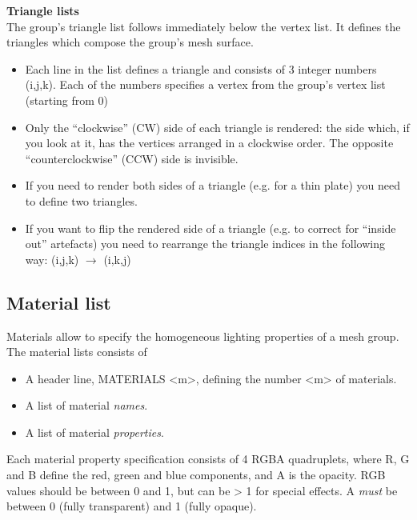 \documentclass[Orbiter Developer Manual.tex]{subfiles}
\begin{document}
\noindent
\textbf{Triangle lists}\\
The group’s triangle list follows immediately below the vertex list. It defines the triangles which compose the group’s mesh surface.

\begin{itemize}
\item Each line in the list defines a triangle and consists of 3 integer numbers (i,j,k). Each of the numbers specifies a vertex from the group’s vertex list (starting from 0)
\item Only the “clockwise” (CW) side of each triangle is rendered: the side which, if you look at it, has the vertices arranged in a clockwise order. The opposite “counterclockwise” (CCW) side is invisible.
\item If you need to render both sides of a triangle (e.g. for a thin plate) you need to define two triangles.
\item If you want to flip the rendered side of a triangle (e.g. to correct for “inside out” artefacts) you need to rearrange the triangle indices in the following way: (i,j,k) $\to$ (i,k,j)
\end{itemize}


\subsection{Material list}
Materials allow to specify the homogeneous lighting properties of a mesh group. The material lists consists of

\begin{itemize}
\item A header line, MATERIALS <m>, defining the number <m> of materials.
\item A list of material \textit{names}.
\item A list of material \textit{properties}.
\end{itemize}

\noindent
Each material property specification consists of 4 RGBA quadruplets, where R, G and B define the red, green and blue components, and A is the opacity. RGB values should be between 0 and 1, but can be > 1 for special effects. A \textit{must} be between 0 (fully transparent) and 1 (fully opaque).
\end{document}
